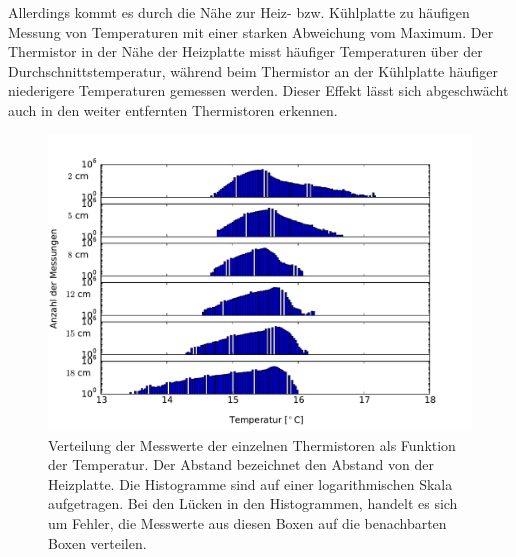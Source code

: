 Allerdings kommt es durch die Nähe zur Heiz- bzw. Kühlplatte zu häufigen Messung von Temperaturen mit einer starken Abweichung vom Maximum.
Der Thermistor in der Nähe der Heizplatte misst häufiger Temperaturen über der Durchschnittstemperatur, während beim Thermistor an der Kühlplatte häufiger niederigere Temperaturen gemessen werden.
Dieser Effekt lässt sich abgeschwächt auch in den weiter entfernten Thermistoren erkennen.
\begin{figure}
	\centering
	\includegraphics[width=\textwidth]{plots/T_hist.pdf}\caption{Verteilung der Messwerte der einzelnen Thermistoren als Funktion der Temperatur. Der Abstand bezeichnet den Abstand von der Heizplatte. Die Histogramme sind auf einer logarithmischen Skala aufgetragen. Bei den Lücken in den Histogrammen, handelt es sich um Fehler, die Messwerte aus diesen Boxen auf die benachbarten Boxen verteilen.}\label{fig:hist}
\end{figure}

